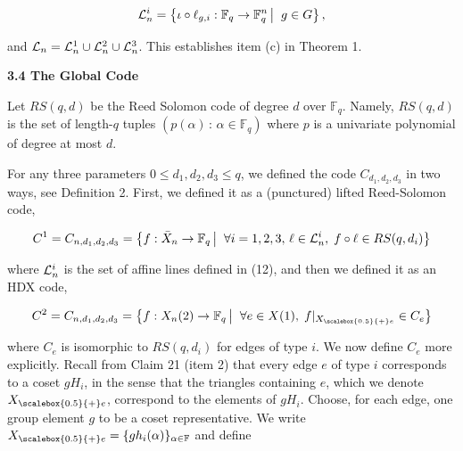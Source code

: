 \[\begin{gathered}
{\cal L}_{n}^{i}=\left\{\iota\circ\ell_{g,i}:\mathbb{F}_{q}\to\mathbb{F}_{q}^{n}\left|\;\vphantom{\iota\circ\ell_{g,i}:\mathbb{F}_{q}\to\mathbb{F}_{q}^{n}g\in G}\right.g\in G\right\},
\end{gathered}\]


and ${\cal L}_{n}={\cal L}_{n}^{1}\cup{\cal L}_{n}^{2}\cup{\cal L}_{n}^{3}$.
This establishes item (c) in Theorem 1.\par






\par\medskip\noindent\textbf{
3.4 The Global Code}\par




Let $RS(q,d)$ be the Reed Solomon code of degree $d$ over $\mathbb{F}_{q}$. Namely, $RS(q,d)$ is the set of length-$q$ tuples $(p(\alpha)\,:\,\alpha\in\mathbb{F}_{q})$ where $p$ is a univariate polynomial of degree at most $d$.\par




For any three parameters $0\leq d_{1},d_{2},d_{3}\leq q$, we defined the code $C_{d_{1},d_{2},d_{3}}$ in two ways, see Definition 2.
First, we defined it as a (punctured) lifted Reed-Solomon code,\par


\[\begin{gathered}
\displaystyle C^{1}=C_{n,d_{1},d_{2},d_{3}} \displaystyle=\left\{f:\bar{X}_{n}\to\mathbb{F}_{q}\left|\;\vphantom{f:\bar{X}_{n}\to\mathbb{F}_{q}\forall i=1,2,3,\,\ell\in{\cal L}_{n}^{i},\;f\circ\ell\in
RS(q,d_{i})}\right.\forall i=1,2,3,\,\ell\in{\cal L}_{n}^{i},\;f\circ\ell\in RS(q,d_{i})\right\}
\end{gathered}\]


where ${\cal L}_{n}^{i}$ is the set of affine lines defined in (12),
and then we defined it as an HDX code,\par


\[\begin{gathered}
\displaystyle C^{2}=C_{n,d_{1},d_{2},d_{3}} \displaystyle=\left\{f:X_{n}(2)\to\mathbb{F}_{q}\left|\;\vphantom{f:X_{n}(2)\to\mathbb{F}_{q}\forall e\in X(1),\;f|_{{X}_{\scalebox{0.5}{+}e}}\in C_{e}}\right.\forall e\in X(1),\;f|_{{X}_{\scalebox{0.5}{+}e}}\in C_{e}\right\}
\end{gathered}\]


where $C_{e}$ is isomorphic to $RS(q,d_{i})$ for edges of type $i$. We now define $C_{e}$ more explicitly. Recall from Claim 21 (item 2) that every edge $e$ of type $i$ corresponds to a coset $gH_{i}$, in the sense that the triangles containing $e$, which we denote ${X}_{\scalebox{0.5}{+}e}$, correspond to the elements of $gH_{i}$. Choose, for each edge, one group element $g$ to be a coset representative. We write ${X}_{\scalebox{0.5}{+}e}=\{gh_{i}(\alpha)\}_{\alpha\in\mathbb{F}}$ and define\par


